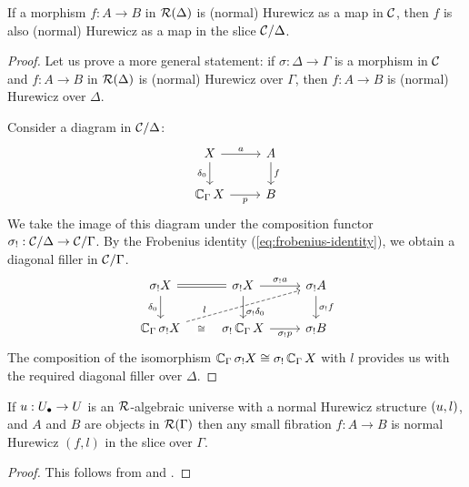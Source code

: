\begin{lemma}\label{lem:global-hurewicz-to-local-hurewicz}
  If a morphism $f : A \to B$ in $\RR(\Delta)$ is (normal) Hurewicz
  as a map in $\CC$,
  then $f$ is also (normal) Hurewicz as a map in the slice $\CC / \Delta$.
\end{lemma}
\begin{proof}
  Let us prove a more general statement:
  if $\sigma : \Delta \to \Gamma$ is a morphism in $\CC$
  and $f : A \to B$ in $\RR(\Delta)$
  is (normal) Hurewicz over $\Gamma$,
  then $f : A \to B$ is (normal) Hurewicz over $\Delta$.

  Consider a diagram in $\CC / \Delta$:
  \[\begin{tikzcd}
      X & A \\
      {\cyl[\Gamma] X} & B
      \arrow["a", from=1-1, to=1-2]
      \arrow["\delta_0"', from=1-1, to=2-1]
      \arrow["f", from=1-2, to=2-2]
      \arrow["p"', from=2-1, to=2-2]
    \end{tikzcd} \]
  We take the image of this diagram under the composition functor
  $\sigma_! : \CC / \Delta \to \CC / \Gamma$.
  By the Frobenius identity (\cref{eq:frobenius-identity}),
  we obtain a diagonal filler in $\CC / \Gamma$.
  \[
  \begin{tikzcd}
    {\sigma_!X} & {\sigma_!X} & {\sigma_!A} \\
    {\cyl[\Gamma]\sigma_! X} & {\sigma_!\cyl[\Gamma] X} & {\sigma_!B}
    \arrow[equals, from=1-1, to=1-2]
    \arrow["{\delta_0}"', from=1-1, to=2-1]
    \arrow["{\sigma_!a}", from=1-2, to=1-3]
    \arrow["{\sigma_!\delta_0}"{pos=0.7}, from=1-2, to=2-2]
    \arrow["{\sigma_!f}", from=1-3, to=2-3]
    \arrow["l"{pos=0.2}, dashed, from=2-1, to=1-3]
    \arrow["\iso"{description}, draw=none, from=2-1, to=2-2]
    \arrow["{\sigma_!p}"', from=2-2, to=2-3]
  \end{tikzcd}
  \]
  The composition of the isomorphism 
  ${\cyl[\Gamma]\sigma_! X} \iso {\sigma_!\cyl[\Gamma] X}$
  with $l$ provides us with the required diagonal filler over $\Delta$.
\end{proof}

\begin{corollary}\label{cor:small-fibration-hurewicz}
  If $\uu : \Ulow \to \U$ is an $\RR$-algebraic universe 
  with a normal Hurewicz structure $(\uu, l)$,
  and $A$ and $B$ are objects in $\RR(\Gamma)$
  then any small fibration $f : A \to B$
  is normal Hurewicz $(f,l)$ in the slice over $\Gamma$.
\end{corollary}
\begin{proof}
  This follows from  and .
\end{proof}

